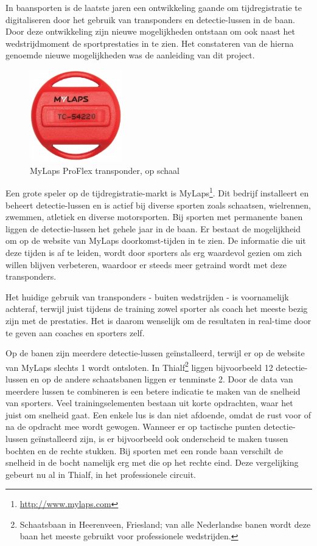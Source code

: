 \newcommand{\aanleiding}{}

In baansporten is de laatste jaren een ontwikkeling gaande om tijdregistratie te digitaliseren door het gebruik van transponders en detectie-lussen in de baan. Door deze ontwikkeling zijn nieuwe mogelijkheden ontstaan om ook naast het wedstrijdmoment de sportprestaties in te zien. Het constateren van de hierna genoemde nieuwe mogelijkheden was de aanleiding van dit project.

\begin{figure}
  \begin{center}
    \includegraphics[width=4cm]{style/images/transponder}
  \end{center}
  \caption{MyLaps ProFlex transponder, op schaal} 
\end{figure}
Een grote speler op de tijdregistratie-markt is MyLaps\footnote{\url{http://www.mylaps.com}}. Dit bedrijf installeert en beheert detectie-lussen en is actief bij diverse sporten zoals schaatsen, wielrennen, zwemmen, atletiek en diverse motorsporten. Bij sporten met permanente banen liggen de detectie-lussen het gehele jaar in de baan. Er bestaat de mogelijkheid om op de website van MyLaps doorkomst-tijden in te zien. De informatie die uit deze tijden is af te leiden, wordt door sporters als erg waardevol gezien om zich willen blijven verbeteren, waardoor er steeds meer getraind wordt met deze transponders.

Het huidige gebruik van transponders - buiten wedstrijden - is voornamelijk achteraf, terwijl juist tijdens de training zowel sporter als coach het meeste bezig zijn met de prestaties. Het is daarom wenselijk om de resultaten in real-time door te geven aan coaches en sporters zelf.

Op de banen zijn meerdere detectie-lussen geïnstalleerd, terwijl er op de website van MyLaps slechts 1 wordt ontsloten. In Thialf\footnote{Schaatsbaan in Heerenveen, Friesland; van alle Nederlandse banen wordt deze baan het meeste gebruikt voor professionele wedstrijden.} liggen bijvoorbeeld 12 detectie-lussen en op de andere schaatsbanen liggen er tenminste 2. Door de data van meerdere lussen te combineren is een betere indicatie te maken van de snelheid van sporters. Veel trainingselementen bestaan uit korte opdrachten, waar het juist om snelheid gaat. Een enkele lus is dan niet afdoende, omdat de rust voor of na de opdracht mee wordt gewogen. Wanneer er op tactische punten detectie-lussen geïnstalleerd zijn, is er bijvoorbeeld ook onderscheid te maken tussen bochten en de rechte stukken. Bij sporten met een ronde baan verschilt de snelheid in de bocht namelijk erg met die op het rechte eind. Deze vergelijking gebeurt nu al in Thialf, in het professionele circuit.

